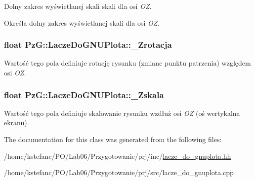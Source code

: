 Dolny zakres wyświetlanej skali skali dla osi {\itshape O\+Z}. 

Określa dolny zakres wyświetlanej skali dla osi {\itshape O\+Z}. \hypertarget{class_pz_g_1_1_lacze_do_g_n_u_plota_aa65781b1ff96dfb31a780e98ee28d6ed}{
\subsubsection[{\+\_\+\+Zrotacja}]{\setlength{\rightskip}{0pt plus 5cm}float Pz\+G\+::\+Lacze\+Do\+G\+N\+U\+Plota\+::\+\_\+\+Zrotacja\hspace{0.3cm}{\ttfamily [protected]}}}\label{class_pz_g_1_1_lacze_do_g_n_u_plota_aa65781b1ff96dfb31a780e98ee28d6ed}
Wartość tego pola definiuje rotację rysunku (zmiane punktu patrzenia) względem osi {\itshape O\+Z}. \hypertarget{class_pz_g_1_1_lacze_do_g_n_u_plota_a85446d06b2d714b2f852ef43c47c73c1}{
\subsubsection[{\+\_\+\+Zskala}]{\setlength{\rightskip}{0pt plus 5cm}float Pz\+G\+::\+Lacze\+Do\+G\+N\+U\+Plota\+::\+\_\+\+Zskala\hspace{0.3cm}{\ttfamily [protected]}}}\label{class_pz_g_1_1_lacze_do_g_n_u_plota_a85446d06b2d714b2f852ef43c47c73c1}
Wartość tego pola definiuje skalowanie rysunku wzdłuż osi {\itshape O\+Z} (oś wertykalna ekranu). 

The documentation for this class was generated from the following files\+:\begin{DoxyCompactItemize}
\item 
/home/kstefanc/\+P\+O/\+Lab06/\+Przygotowanie/prj/inc/\hyperlink{lacze__do__gnuplota_8hh}{lacze\+\_\+do\+\_\+gnuplota.\+hh}\item 
/home/kstefanc/\+P\+O/\+Lab06/\+Przygotowanie/prj/src/lacze\+\_\+do\+\_\+gnuplota.\+cpp\end{DoxyCompactItemize}
